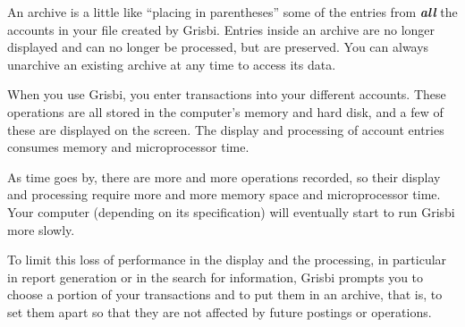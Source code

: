 An archive is a little like \enquote{placing in parentheses} some of the entries from \textit{\textbf{all}} the accounts in your file created by Grisbi. Entries inside an archive are no longer displayed and can no longer be processed, but are preserved. You can always unarchive an existing archive at any time to access its data.

\vspace{.2em}
When you use Grisbi, you enter transactions into your different accounts. These operations are all stored in the computer's memory and hard disk, and a few of these are displayed on the screen. The display and processing of account entries consumes memory and microprocessor time.

\vspace{.2em}
As time goes by, there are more and more operations recorded, so their display and processing require more and more memory space and microprocessor time. Your computer (depending on its specification) will eventually start to run Grisbi more slowly.

\vspace{.2em}
To limit this loss of performance in the display and the processing, in particular in report generation or in the search for information, Grisbi prompts you to choose a portion of your transactions and to put them in an archive, that is, to set them apart so that they are not affected by future postings or operations.


